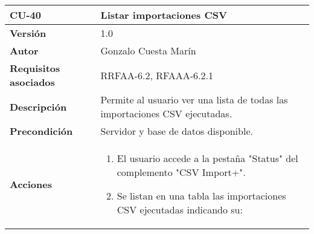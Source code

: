 \begin{longtable}[]{@{}ll@{}}
\toprule
\begin{minipage}[b]{0.19\columnwidth}\raggedright
\textbf{CU-40}\strut
\end{minipage} & \begin{minipage}[b]{0.75\columnwidth}\raggedright
\textbf{Listar importaciones CSV}\strut
\end{minipage}\tabularnewline
\midrule
\endhead
\begin{minipage}[t]{0.19\columnwidth}\raggedright
\textbf{Versión}\strut
\end{minipage} & \begin{minipage}[t]{0.75\columnwidth}\raggedright
1.0\strut
\end{minipage}\tabularnewline
\begin{minipage}[t]{0.19\columnwidth}\raggedright
\textbf{Autor}\strut
\end{minipage} & \begin{minipage}[t]{0.75\columnwidth}\raggedright
Gonzalo Cuesta Marín\strut
\end{minipage}\tabularnewline
\begin{minipage}[t]{0.19\columnwidth}\raggedright
\textbf{Requisitos asociados}\strut
\end{minipage} & \begin{minipage}[t]{0.75\columnwidth}\raggedright
RRFAA-6.2, RFAAA-6.2.1\strut
\end{minipage}\tabularnewline
\begin{minipage}[t]{0.19\columnwidth}\raggedright
\textbf{Descripción}\strut
\end{minipage} & \begin{minipage}[t]{0.75\columnwidth}\raggedright
Permite al usuario ver una lista de todas las importaciones CSV
ejecutadas.\strut
\end{minipage}\tabularnewline
\begin{minipage}[t]{0.19\columnwidth}\raggedright
\textbf{Precondición}\strut
\end{minipage} & \begin{minipage}[t]{0.75\columnwidth}\raggedright
Servidor y base de datos disponible.\strut
\end{minipage}\tabularnewline
\begin{minipage}[t]{0.19\columnwidth}\raggedright
\textbf{Acciones}\strut
\end{minipage} & \begin{minipage}[t]{0.75\columnwidth}\raggedright
\begin{enumerate}
\def\labelenumi{\arabic{enumi}.}
\tightlist
\item
  El usuario accede a la pestaña "Status" del complemento "CSV Import+".
\item
  Se listan en una tabla las importaciones CSV ejecutadas indicando su:


\end{enumerate}
\end{minipage}
\end{longtable}

